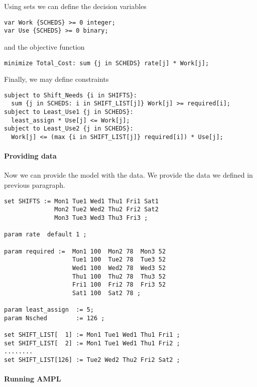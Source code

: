 Using sets we can define the decision variables
\begin{lstlisting}
var Work {SCHEDS} >= 0 integer; 
var Use {SCHEDS} >= 0 binary;
\end{lstlisting}

and the objective function

\begin{lstlisting}
minimize Total_Cost: sum {j in SCHEDS} rate[j] * Work[j];
\end{lstlisting}

Finally, we may define constraints

\begin{lstlisting}
subject to Shift_Needs {i in SHIFTS}:
  sum {j in SCHEDS: i in SHIFT_LIST[j]} Work[j] >= required[i];
subject to Least_Use1 {j in SCHEDS}: 
  least_assign * Use[j] <= Work[j];
subject to Least_Use2 {j in SCHEDS}:
  Work[j] <= (max {i in SHIFT_LIST[j]} required[i]) * Use[j];
\end{lstlisting}

\paragraph{Providing data}

Now we can provide the model with the data. We provide the data we defined in previous paragraph.

\begin{lstlisting}
set SHIFTS := Mon1 Tue1 Wed1 Thu1 Fri1 Sat1
              Mon2 Tue2 Wed2 Thu2 Fri2 Sat2
              Mon3 Tue3 Wed3 Thu3 Fri3 ;

param rate  default 1 ;

param required :=  Mon1 100  Mon2 78  Mon3 52 
                   Tue1 100  Tue2 78  Tue3 52
                   Wed1 100  Wed2 78  Wed3 52
                   Thu1 100  Thu2 78  Thu3 52
                   Fri1 100  Fri2 78  Fri3 52
                   Sat1 100  Sat2 78 ;
                   
param least_assign  := 5;
param Nsched        := 126 ;

set SHIFT_LIST[  1] := Mon1 Tue1 Wed1 Thu1 Fri1 ;
set SHIFT_LIST[  2] := Mon1 Tue1 Wed1 Thu1 Fri2 ;
........
set SHIFT_LIST[126] := Tue2 Wed2 Thu2 Fri2 Sat2 ;
\end{lstlisting} 

\paragraph{Running AMPL}

